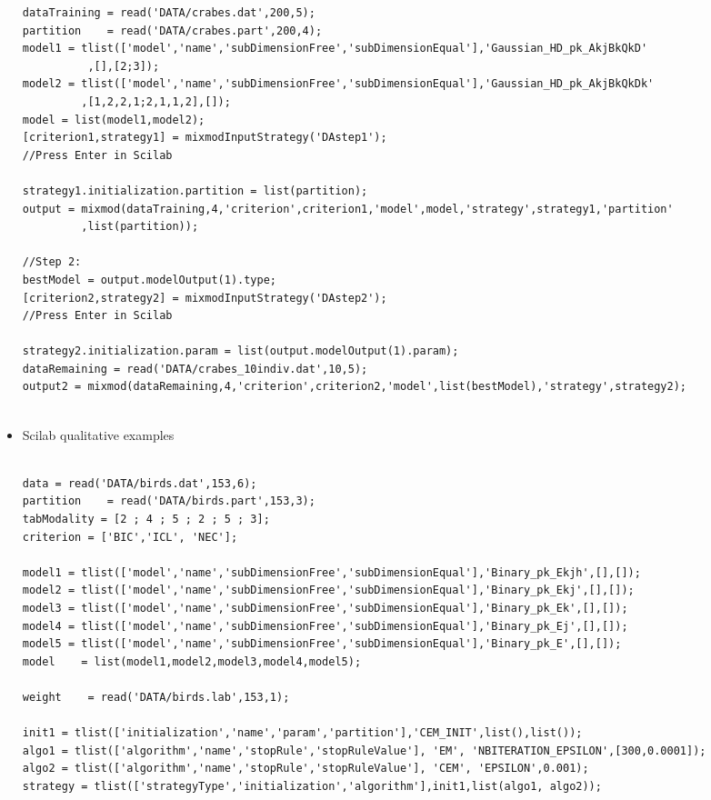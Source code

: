 \begin{itemize}
{\begin{verbatim}
dataTraining = read('DATA/crabes.dat',200,5);
partition    = read('DATA/crabes.part',200,4);
model1 = tlist(['model','name','subDimensionFree','subDimensionEqual'],'Gaussian_HD_pk_AkjBkQkD'
          ,[],[2;3]);
model2 = tlist(['model','name','subDimensionFree','subDimensionEqual'],'Gaussian_HD_pk_AkjBkQkDk'
         ,[1,2,2,1;2,1,1,2],[]);
model = list(model1,model2);
[criterion1,strategy1] = mixmodInputStrategy('DAstep1');
//Press Enter in Scilab

strategy1.initialization.partition = list(partition);
output = mixmod(dataTraining,4,'criterion',criterion1,'model',model,'strategy',strategy1,'partition'
         ,list(partition));

//Step 2:
bestModel = output.modelOutput(1).type;
[criterion2,strategy2] = mixmodInputStrategy('DAstep2');
//Press Enter in Scilab

strategy2.initialization.param = list(output.modelOutput(1).param);
dataRemaining = read('DATA/crabes_10indiv.dat',10,5);
output2 = mixmod(dataRemaining,4,'criterion',criterion2,'model',list(bestModel),'strategy',strategy2);


\end{verbatim}}


\item Scilab qualitative examples \\
{\scriptsize

 \begin{verbatim}

data = read('DATA/birds.dat',153,6);
partition    = read('DATA/birds.part',153,3);
tabModality = [2 ; 4 ; 5 ; 2 ; 5 ; 3];
criterion = ['BIC','ICL', 'NEC'];

model1 = tlist(['model','name','subDimensionFree','subDimensionEqual'],'Binary_pk_Ekjh',[],[]);
model2 = tlist(['model','name','subDimensionFree','subDimensionEqual'],'Binary_pk_Ekj',[],[]);
model3 = tlist(['model','name','subDimensionFree','subDimensionEqual'],'Binary_pk_Ek',[],[]);
model4 = tlist(['model','name','subDimensionFree','subDimensionEqual'],'Binary_pk_Ej',[],[]);
model5 = tlist(['model','name','subDimensionFree','subDimensionEqual'],'Binary_pk_E',[],[]);
model    = list(model1,model2,model3,model4,model5);

weight    = read('DATA/birds.lab',153,1);

init1 = tlist(['initialization','name','param','partition'],'CEM_INIT',list(),list());
algo1 = tlist(['algorithm','name','stopRule','stopRuleValue'], 'EM', 'NBITERATION_EPSILON',[300,0.0001]);
algo2 = tlist(['algorithm','name','stopRule','stopRuleValue'], 'CEM', 'EPSILON',0.001);
strategy = tlist(['strategyType','initialization','algorithm'],init1,list(algo1, algo2));


\end{verbatim}}
\end{itemize}
